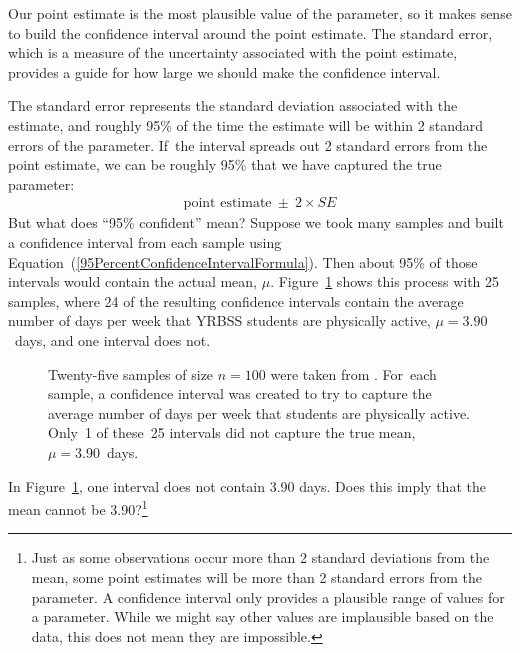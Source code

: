 Our point estimate is the most plausible value of the parameter, so it makes sense to build the confidence interval around the point estimate. The standard error, which is a measure of the uncertainty associated with the point estimate, provides a guide for how large we should make the confidence interval.

The standard error represents the standard deviation associated with the estimate, and roughly 95\% of the time the estimate will be within 2 standard errors of the parameter. If~the interval spreads out 2 standard errors from the point estimate, we can be roughly 95\%  that we have captured the true parameter:
\begin{eqnarray}
\text{point estimate}\ \pm\ 2\times SE
\label{95PercentConfidenceIntervalFormula}
\end{eqnarray}
But what does ``95\% confident'' mean? Suppose we took many samples and built a confidence interval from each sample using Equation~(\ref{95PercentConfidenceIntervalFormula}). Then about 95\% of those intervals would contain the actual mean, $\mu$. Figure~\ref{95PercentConfidenceInterval} shows this process with 25 samples, where 24 of the resulting confidence intervals contain the average number of days per week that YRBSS students are physically active, $\mu=3.90$~days, and one interval does not.

\begin{figure}[b]
   \centering
   \caption{Twenty-five samples of size $n=100$ were taken from . For~each sample, a confidence interval was created to try to capture the average number of days per week that students are physically active. Only~1 of these~25 intervals did not capture the true mean, $\mu = 3.90$~days.}
   \label{95PercentConfidenceInterval}
\end{figure}

\begin{exercise}
In Figure~\ref{95PercentConfidenceInterval}, one interval does not contain 3.90 days. Does this imply that the mean cannot be 3.90?\footnote{Just as some observations occur more than 2 standard deviations from the mean, some point estimates will be more than 2 standard errors from the parameter. A confidence interval only provides a plausible range of values for a parameter. While we might say other values are implausible based on the data, this does not mean they are impossible.}
\end{exercise}

